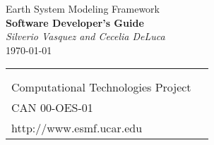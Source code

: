 \documentclass[english]{article}
\begin{document}

\begin{titlepage}

\begin{center}
{\Large    Earth System Modeling Framework } \\
{\Large {\bf  Software Developer's Guide}} \\
\medskip
{\it Silverio Vasquez and Cecelia DeLuca} \\
\vspace{.5in}
{\large \today}
\end{center}

\begin{latexonly}
\vspace{6in}
\begin{tabular}{p{5in}p{.9in}}
\hrulefill \\
\noindent {\bf NASA Earth Science Technology Office} \\
\noindent Computational Technologies Project \\
\noindent CAN 00-OES-01 \\
\noindent http://www.esmf.ucar.edu \\
\end{tabular}
\end{latexonly}

\end{titlepage}

\tableofcontents

\newpage












\end{document}
